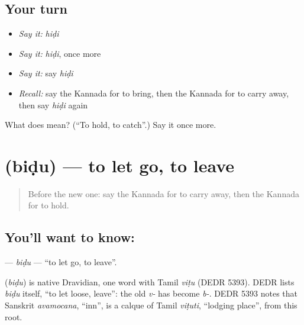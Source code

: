 \subsection*{Your turn}
\begin{itemize}
\raggedright
  \item \emph{Say it:} \emph{hiḍi}
  \item \emph{Say it:} \emph{hiḍi}, once more
  \item \emph{Say it:} say \emph{hiḍi}
  \item \emph{Recall:} say the Kannada for to bring, then the Kannada for to carry away, then say \emph{hiḍi} again
\end{itemize}

\begin{tcolorbox}[breakable,colback=teal!4,colframe=teal!35!black,title={Before you move on}]
What does  mean? (\textquotedblleft{}To hold, to catch\textquotedblright{}.) Say it once more.
\end{tcolorbox}
\section[\texorpdfstring{\kn{ಬಿಡು} (biḍu)}{ಬಿಡು (biḍu)}]{ (biḍu) — to let go, to leave}

\label{lesson:KA-C198-bidu}



\begin{quote}
Before the new one: say the Kannada for to carry away, then the Kannada for to hold.
\end{quote}

\subsection*{You'll want to know: }
\textbf{} — \emph{biḍu} — \textquotedblleft{}to let go, to leave\textquotedblright{}.

\begin{cousinweb}
\textbf{} (\emph{biḍu}) is native Dravidian, one word with Tamil \emph{viṭu} (DEDR 5393). DEDR lists \emph{biḍu} itself, \textquotedblleft{}to let loose, leave\textquotedblright{}: the old \emph{v-} has become \emph{b-}. DEDR 5393 notes that Sanskrit \emph{avamocana}, \textquotedblleft{}inn\textquotedblright{}, is a calque of Tamil \emph{viṭuti}, \textquotedblleft{}lodging place\textquotedblright{}, from this root.
\end{cousinweb}


